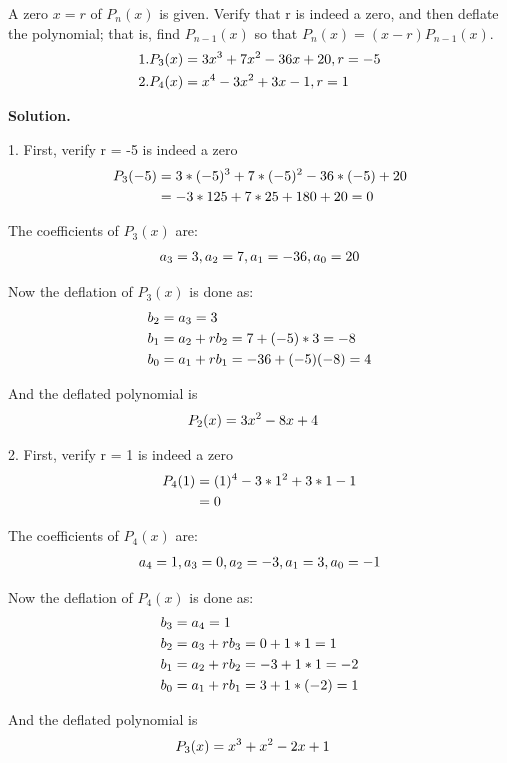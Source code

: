 \begin{exercise}{2} %
A zero $x = r$ of $P_n(x)$ is given. Verify that r is indeed a zero, and then deflate the polynomial; that is, find $P_{n-1}(x)$ so that $P_n(x) = (x-r)P_{n-1}(x)$.
\begin{align}
1. P_3(x) &= 3x^3 + 7x^2 - 36x + 20, r = -5 \notag \\
2. P_4(x) &= x^4 - 3x^2 + 3x - 1, r = 1 \notag
\end{align}

\textbf{Solution.}

1. First, verify r = -5 is indeed a zero
\begin{align}
P_3(-5) &= 3*(-5)^3 + 7*(-5)^2 - 36*(-5) + 20 \notag \\
&=-3*125 + 7*25 + 180 + 20 = 0 \notag 
\end{align}

The coefficients of $P_3(x)$ are:
\begin{align}
a_3 = 3, a_2 = 7, a_1 = -36, a_0 = 20 \notag 
\end{align}

Now the deflation of $P_3(x)$ is done as: 
\begin{align}
b_2 &= a_3 = 3 \notag \\ 
b_1 &= a_2 + rb_2 = 7 + (-5)*3 = -8 \notag \\
b_0 &= a_1 + rb_1 = -36 + (-5)(-8) = 4 \notag 
\end{align}

And the deflated polynomial is
\begin{align}
P_2(x) &= 3x^2 - 8x + 4 \notag 
\end{align}

2. First, verify r = 1 is indeed a zero
\begin{align}
P_4(1) &= (1)^4 - 3*1^2 + 3* 1 - 1 \notag \\
&= 0 \notag
\end{align}

The coefficients of $P_4(x)$ are:
\begin{align}
a_4 = 1, a_3 = 0, a_2 = -3, a_1 = 3, a_0 = -1 \notag 
\end{align}

Now the deflation of $P_4(x)$ is done as: 
\begin{align}
b_3 &= a_4 = 1 \notag \\ 
b_2 &= a_3 + rb_3 = 0 + 1*1 = 1 \notag \\ 
b_1 &= a_2 + rb_2 = -3 + 1*1 = -2 \notag \\
b_0 &= a_1 + rb_1 = 3 + 1*(-2) = 1 \notag
\end{align}


And the deflated polynomial is
\begin{align}
P_3(x) &= x^3 + x^2 - 2x + 1 \notag 
\end{align}
\end{exercise}


